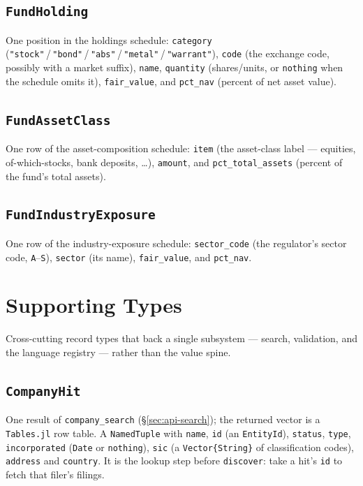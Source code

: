 \documentclass[11pt,a4paper]{report}
\begin{document}
\subsection{\texttt{FundHolding}}
\label{sec:api-fundholding}

\noindent One position in the holdings schedule: \texttt{category}
(\texttt{"stock"}\,/\,\texttt{"bond"}\,/\,\texttt{"abs"}\,/\,\texttt{"metal"}\,/\,\texttt{"warrant"}),
\texttt{code} (the exchange code, possibly with a market suffix), \texttt{name}, \texttt{quantity}
(shares/units, or \texttt{nothing} when the schedule omits it), \texttt{fair\_value}, and \texttt{pct\_nav}
(percent of net asset value).

\subsection{\texttt{FundAssetClass}}
\label{sec:api-fundassetclass}

\noindent One row of the asset-composition schedule: \texttt{item} (the asset-class label --- equities,
of-which-stocks, bank deposits, \ldots), \texttt{amount}, and \texttt{pct\_total\_assets} (percent of the
fund's total assets).

\subsection{\texttt{FundIndustryExposure}}
\label{sec:api-fundindustryexposure}

\noindent One row of the industry-exposure schedule: \texttt{sector\_code} (the regulator's sector code,
\texttt{A}--\texttt{S}), \texttt{sector} (its name), \texttt{fair\_value}, and \texttt{pct\_nav}.

\section{Supporting Types}
\label{sec:api-supporting-types}

\noindent Cross-cutting record types that back a single subsystem --- search, validation, and the language
registry --- rather than the value spine.

\subsection{\texttt{CompanyHit}}
\label{sec:api-companyhit}

\noindent One result of \texttt{company\_search} (\S\ref{sec:api-search}); the returned vector is a
\texttt{Tables.jl} row table. A \texttt{NamedTuple} with \texttt{name}, \texttt{id} (an \texttt{EntityId}),
\texttt{status}, \texttt{type}, \texttt{incorporated} (\texttt{Date} or \texttt{nothing}), \texttt{sic} (a
\texttt{Vector\{String\}} of classification codes), \texttt{address} and \texttt{country}. It is the lookup step
before \texttt{discover}: take a hit's \texttt{id} to fetch that filer's filings.
\end{document}
